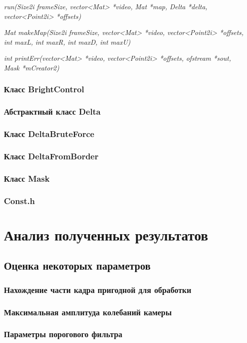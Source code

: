 \textit{run(Size2i frameSize, vector<Mat> *video, Mat *map, Delta *delta,
    vector<Point2i> *offsets)}

\textit{Mat makeMap(Size2i frameSize, vector<Mat> *video, vector<Point2i> *offsets,
    int maxL, int maxR, int maxD, int maxU)}

\textit{int printErr(vector<Mat> *video, vector<Point2i> *offsets, ofstream *sout, Mask *mCreator2)
}


\subsubsection{Класс BrightControl~}
\subsubsection{Абстрактный класс Delta~}
\subsubsection{Класс DeltaBruteForce~}
\subsubsection{Класс DeltaFromBorder~}
\subsubsection{Класс Mask~}
\subsubsection{Const.h~}

\section{Анализ полученных результатов}
\subsection{Оценка некоторых параметров}
\subsubsection{Нахождение части кадра пригодной для обработки}
\subsubsection{Максимальная амплитуда колебаний камеры}
\subsubsection{Параметры порогового фильтра}